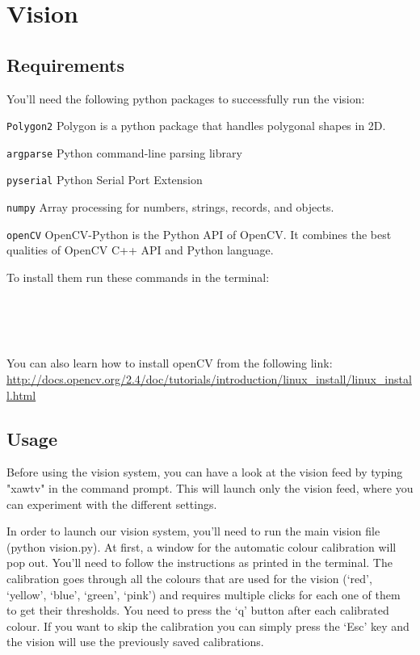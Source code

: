\section{Vision}

\subsection{Requirements}
You'll need the following python packages to successfully run the vision:

\begin{description}
\item \texttt{Polygon2} Polygon is a python package that handles polygonal shapes in 2D. 
\item \texttt{argparse} Python command-line parsing library
\item \texttt{pyserial} Python Serial Port Extension
\item \texttt{numpy} Array processing for numbers, strings, records, and objects.
\item \texttt{openCV} OpenCV-Python is the Python API of OpenCV. It combines the best qualities of OpenCV C++ API and Python language.
\end{description}

To install them run these commands in the terminal:

 \\
 \\
 \\

You can also learn how to install openCV from the following link:
\url{http://docs.opencv.org/2.4/doc/tutorials/introduction/linux_install/linux_install.html}

\subsection{Usage}
Before using the vision system, you can have a look at the vision feed by typing "xawtv" in the command prompt. This will launch only the vision feed, where you can experiment with the different settings.

In order to launch our vision system, you'll need to run the main vision file (python vision.py). At first, a window for the automatic colour calibration will pop out. You'll need to follow the instructions as printed in the terminal. The calibration goes through all the colours that are used for the vision (‘red’, ‘yellow’, ‘blue’, ‘green’, ‘pink’) and requires multiple clicks for each one of them to get their thresholds. You need to press the ‘q’ button after each calibrated colour. If you want to skip the calibration you can simply press the ‘Esc’ key and the vision will use the previously saved calibrations.


